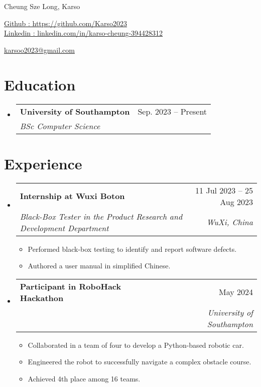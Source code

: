 \documentclass[letterpaper,10pt]{article}
\makeatletter
\newcommand{\resumeItem}[1]{
  \item\small{
    {#1 \vspace{-2pt}}
  }
}
\newcommand{\resumeSubheading}[4]{
  \vspace{-2pt}\item
    \begin{tabular*}{0.97\textwidth}[t]{l@{\extracolsep{\fill}}r}
      \textbf{#1} & #2 \\
      \textit{\small#3} & \textit{\small #4} \\
    \end{tabular*}\vspace{-7pt}
}
\newcommand{\resumeSubHeadingListStart}{\begin{itemize}[leftmargin=0.15in, label={}]}
\newcommand{\resumeSubHeadingListEnd}{\end{itemize}}
\newcommand{\resumeItemListStart}{\begin{itemize}}
\newcommand{\resumeItemListEnd}{\end{itemize}\vspace{-5pt}}
\makeatother
\begin{document}
\begin{center}
    {\LARGE Cheung Sze Long, Karso} \\ \vspace{2pt}
    \begin{multicols}{2}
    \begin{flushleft}
    \href{https://github.com/Karso2023}{Github : https://github.com/Karso2023}\\
    \href{linkedin.com/in/karso-cheung-394428312}{Linkedin : linkedin.com/in/karso-cheung-394428312}
    \end{flushleft}
    
    \begin{flushright}
    \href{mailto:karsoo2023@gmail.com}{karsoo2023@gmail.com}
    \end{flushright}
    \end{multicols}
\end{center}

\vspace{-2pt}
\section{Education}
  \resumeSubHeadingListStart
    \resumeSubheading
      {University of Southampton}{Sep. 2023 -- Present}
      {BSc Computer Science}{}
  \resumeSubHeadingListEnd

\section{Experience}

\resumeSubHeadingListStart
    \resumeSubheading
      {Internship at Wuxi Boton}{11 Jul 2023 -- 25 Aug 2023}
      {Black-Box Tester in the Product Research and Development Department}{WuXi, China}
      \resumeItemListStart
        \resumeItem{Performed black-box testing to identify and report software defects.}
        \resumeItem{Authored a user manual in simplified Chinese.}
      \resumeItemListEnd
\resumeSubHeadingListEnd

\resumeSubHeadingListStart
    \resumeSubheading
      {Participant in RoboHack Hackathon}{May 2024}
      {}{University of Southampton}
      \resumeItemListStart
        \resumeItem{Collaborated in a team of four to develop a Python-based robotic car.}
        \resumeItem{Engineered the robot to successfully navigate a complex obstacle course.}
        \resumeItem{Achieved 4th place among 16 teams.}
      \resumeItemListEnd
\resumeSubHeadingListEnd
\end{document}
